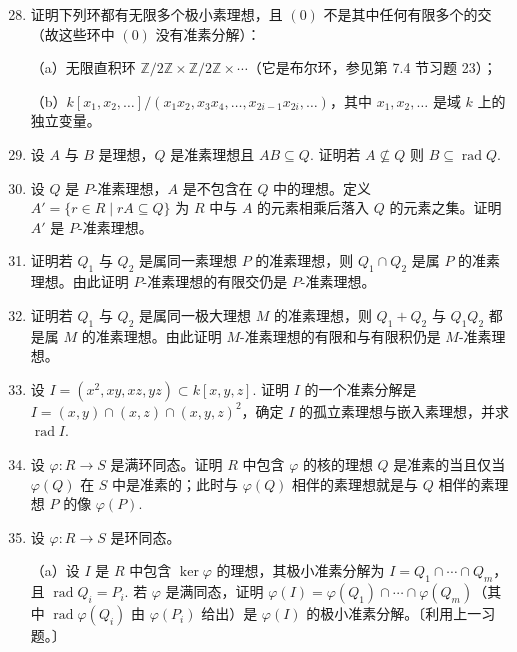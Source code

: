 \begin{enumerate}
\setcounter{enumi}{27}

\item 证明下列环都有无限多个极小素理想，且 \((0)\) 不是其中任何有限多个的交（故这些环中 \((0)\) 没有准素分解）：

（a）无限直积环 \(\mathbb{Z}/2\mathbb{Z} \times \mathbb{Z}/2\mathbb{Z} \times \cdots\)（它是布尔环，参见第 7.4 节习题 23）；

（b）\(k[x_1, x_2, \ldots]/(x_1x_2, x_3x_4, \ldots, x_{2i-1}x_{2i}, \ldots)\)，其中 \(x_1, x_2, \ldots\) 是域 \(k\) 上的独立变量。

\item 设 \(A\) 与 \(B\) 是理想，\(Q\) 是准素理想且 \(AB \subseteq Q\). 证明若 \(A \nsubseteq Q\) 则 \(B \subseteq \operatorname{rad}Q\).

\item 设 \(Q\) 是 \(P\)-准素理想，\(A\) 是不包含在 \(Q\) 中的理想。定义 \(A' = \{r \in R \mid rA \subseteq Q\}\) 为 \(R\) 中与 \(A\) 的元素相乘后落入 \(Q\) 的元素之集。证明 \(A'\) 是 \(P\)-准素理想。

\item 证明若 \(Q_1\) 与 \(Q_2\) 是属同一素理想 \(P\) 的准素理想，则 \(Q_1 \cap Q_2\) 是属 \(P\) 的准素理想。由此证明 \(P\)-准素理想的有限交仍是 \(P\)-准素理想。

\item 证明若 \(Q_1\) 与 \(Q_2\) 是属同一极大理想 \(M\) 的准素理想，则 \(Q_1+Q_2\) 与 \(Q_1Q_2\) 都是属 \(M\) 的准素理想。由此证明 \(M\)-准素理想的有限和与有限积仍是 \(M\)-准素理想。

\item 设 \(I = (x^2, xy, xz, yz) \subset k[x,y,z]\). 证明 \(I\) 的一个准素分解是 \(I = (x,y) \cap (x,z) \cap (x,y,z)^2\)，确定 \(I\) 的孤立素理想与嵌入素理想，并求 \(\operatorname{rad}I\).

\item 设 \(\varphi : R \to S\) 是满环同态。证明 \(R\) 中包含 \(\varphi\) 的核的理想 \(Q\) 是准素的当且仅当 \(\varphi(Q)\) 在 \(S\) 中是准素的；此时与 \(\varphi(Q)\) 相伴的素理想就是与 \(Q\) 相伴的素理想 \(P\) 的像 \(\varphi(P)\).

\item 设 \(\varphi : R \to S\) 是环同态。

（a）设 \(I\) 是 \(R\) 中包含 \(\ker\varphi\) 的理想，其极小准素分解为 \(I = Q_1 \cap \cdots \cap Q_m\)，且 \(\operatorname{rad}Q_i = P_i\). 若 \(\varphi\) 是满同态，证明 \(\varphi(I) = \varphi(Q_1) \cap \cdots \cap \varphi(Q_m)\)（其中 \(\operatorname{rad}\varphi(Q_i)\) 由 \(\varphi(P_i)\) 给出）是 \(\varphi(I)\) 的极小准素分解。〔利用上一习题。〕


\end{enumerate}
